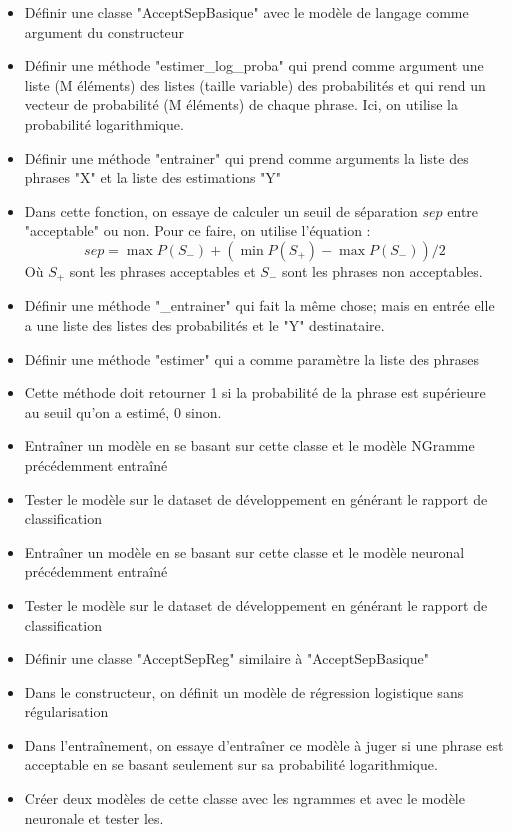 \documentclass[11pt, a4paper]{article}
\begin{document}
\begin{itemize}
	\item Définir une classe "AcceptSepBasique" avec le modèle de langage comme argument du constructeur
	\item Définir une méthode "estimer\_log\_proba" qui prend comme argument une liste (M éléments) des listes (taille variable) des probabilités et qui rend un vecteur de probabilité (M éléments) de chaque phrase. 
	Ici, on utilise la probabilité logarithmique.
	\item Définir une méthode "entrainer" qui prend comme arguments la liste des phrases "X" et la liste des estimations "Y"
	\item Dans cette fonction, on essaye de calculer un seuil de séparation $sep$ entre "acceptable" ou non. 
	Pour ce faire, on utilise l'équation :
	\[sep = \max P(S_-) + (\min P(S_+) - \max P(S_-))/2\]
	Où $S_+$ sont les phrases acceptables et $S_-$ sont les phrases non acceptables.
	\item Définir une méthode "\_entrainer" qui fait la même chose; mais en entrée elle a une liste des listes des probabilités et le "Y" destinataire.
	\item Définir une méthode "estimer" qui a comme paramètre la liste des phrases
	\item Cette méthode doit retourner 1 si la probabilité de la phrase est supérieure au seuil qu'on a estimé, 0 sinon.
	\item Entraîner un modèle en se basant sur cette classe et le modèle NGramme précédemment entraîné
	\item Tester le modèle sur le dataset de développement en générant le rapport de classification
	\item Entraîner un modèle en se basant sur cette classe et le modèle neuronal précédemment entraîné
	\item Tester le modèle sur le dataset de développement en générant le rapport de classification
	\item Définir une classe "AcceptSepReg" similaire à "AcceptSepBasique"
	\item Dans le constructeur, on définit un modèle de régression logistique sans régularisation
	\item Dans l'entraînement, on essaye d'entraîner ce modèle à juger si une phrase est acceptable en se basant seulement sur sa probabilité logarithmique.
	\item Créer deux modèles de cette classe avec les ngrammes et avec le modèle neuronale et tester les.
\end{itemize}
\end{document}
